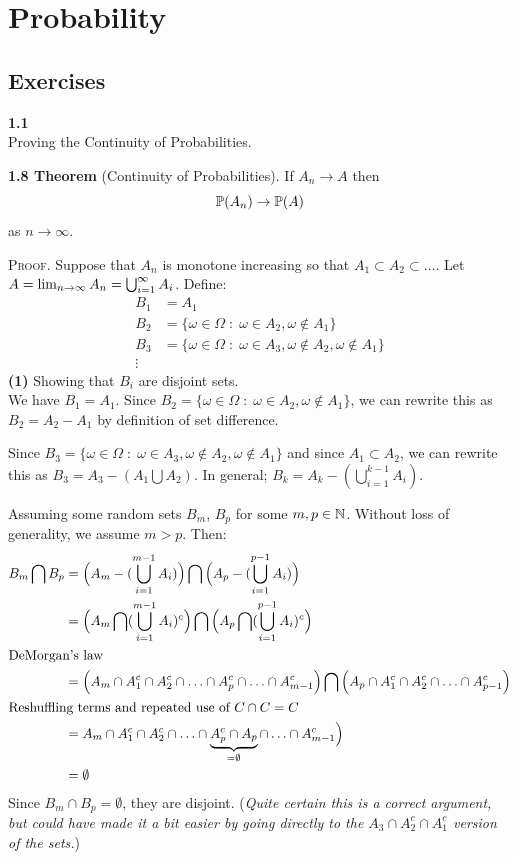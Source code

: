 
\newpage
\section{Probability}

\subsection*{Exercises}

\textbf{1.1}\\  %
Proving the Continuity of Probabilities.

\bigskip\noindent
\textbf{1.8 Theorem} (Continuity of Probabilities). If $A_n\rightarrow A$
then
\[
    \P(A_n)\rightarrow\P(A)
\]
as $n\rightarrow\infty$.

\bigskip\noindent
\textsc{Proof}. Suppose that $A_n$ is monotone increasing so that
$A_1\subset A_2 \subset\ldots$.
Let $A = \lim_{n\ra\infty} A_n = \bigcup_{i=1}^\infty A_i$.
Define:
\begin{align*}
    B_1 &= A_1 \\
    B_2 &= \{\omega\in\Omega \;:\; \omega\in A_2,\omega\not\in A_1\} \\
    B_3 &= \{\omega\in\Omega \;:\; \omega\in A_3,\omega\not\in A_2,\omega\not\in A_1\} \\
    \vdots &
\end{align*}
\textbf{(1)} Showing that $B_i$ are disjoint sets.\\
We have $B_1 = A_1$. Since $B_2 = \{\omega\in\Omega \;:\; \omega\in A_2,\omega\not\in A_1\}$,
we can rewrite this as $B_2 = A_2 - A_1$ by definition of set difference.

Since $B_3 = \{\omega\in\Omega \;:\; \omega\in A_3,\omega\not\in A_2,\omega\not\in A_1\}$
and since $A_1\subset A_2$, we can rewrite this as $B_3 = A_3 - (A_1\bigcup A_2)$.
In general; $B_k = A_k - (\bigcup_{i=1}^{k-1}A_i)$.

Assuming some random sets $B_m$, $B_p$ for some $m,p\in\N$. Without loss of generality,
we assume $m > p$. Then:
\begin{align*}
    B_m\bigcap B_p &=
    \Big(A_m - (\bigcup_{i=1}^{m-1}A_i)\Big)\bigcap \Big(A_p - (\bigcup_{i=1}^{p-1}A_i)\Big)\\
    &= 
    \Big(A_m \bigcap(\bigcup_{i=1}^{m-1}A_i)^c\Big)\bigcap \Big(A_p \bigcap (\bigcup_{i=1}^{p-1}A_i)^c\Big)\\
    \shortintertext{DeMorgan's law}
    &= 
    \Big(A_m \cap A_1^c \cap A_2^c \cap \ldots \cap A_p^c \cap \ldots \cap A_{m-1}^c\Big)\bigcap
    \Big(A_p \cap A_1^c \cap A_2^c \cap \ldots \cap A_{p-1}^c\Big) \\
\shortintertext{Reshuffling terms and repeated use of $C\cap C = C$}
    &= A_m \cap A_1^c \cap A_2^c \cap \ldots \cap \underbrace{A_p^c\cap A_p}_{=\emptyset} \cap \ldots \cap A_{m-1}^c\Big) \\
    &= \emptyset
\end{align*}
Since $B_m\cap B_p = \emptyset$, they are disjoint. (\emph{Quite certain this is a correct argument, but could have
made it a bit easier by going directly to the $A_3\cap A_2^c\cap A_1^c$ version of the sets.})


